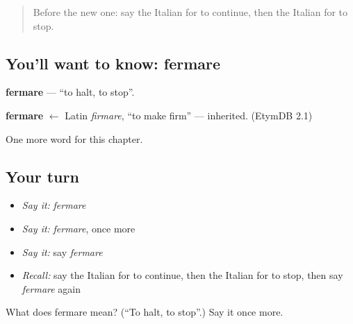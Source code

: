 \begin{quote}
Before the new one: say the Italian for to continue, then the Italian for to stop.
\end{quote}

\subsection*{You'll want to know: fermare}
\textbf{fermare} — \textquotedblleft{}to halt, to stop\textquotedblright{}.

\begin{cousinweb}
\textbf{fermare} $\leftarrow$ Latin \emph{firmare}, \textquotedblleft{}to make firm\textquotedblright{} — inherited. (EtymDB 2.1)
\end{cousinweb}

\begin{grammarlens}[title={What you've built}]
One more word for this chapter.
\end{grammarlens}

\subsection*{Your turn}
\begin{itemize}
\raggedright
  \item \emph{Say it:} \emph{fermare}
  \item \emph{Say it:} \emph{fermare}, once more
  \item \emph{Say it:} say \emph{fermare}
  \item \emph{Recall:} say the Italian for to continue, then the Italian for to stop, then say \emph{fermare} again
\end{itemize}

\begin{tcolorbox}[breakable,colback=teal!4,colframe=teal!35!black,title={Before you move on}]
What does fermare mean? (\textquotedblleft{}To halt, to stop\textquotedblright{}.) Say it once more.
\end{tcolorbox}
